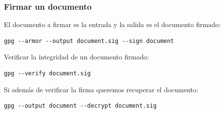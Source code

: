 \documentclass{beamer}
\begin{document}
\begin{frame}[fragile]
\frametitle{Firmar un documento}

El documento a firmar es la entrada y la salida es el documento firmado:



\begin{lstlisting}[frame=trBL]
gpg --armor --output document.sig --sign document
\end{lstlisting}

\medskip

Verificar la integridad de un documento firmado:
\begin{lstlisting}[frame=trBL]
gpg --verify document.sig
\end{lstlisting}

\medskip

Si además de verificar la firma queremos recuperar el documento:
\begin{lstlisting}[frame=trBL]
gpg --output document --decrypt document.sig
\end{lstlisting}


\end{frame}




{
}
\end{document}
